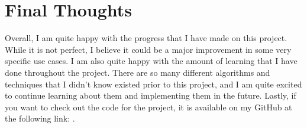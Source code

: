 \documentclass{article}
\begin{document}
\section{Final Thoughts}
Overall, I am quite happy with the progress that I have made on this project. While it is not
perfect, I believe it could be a major improvement in some very specific use cases. I am also
quite happy with the amount of learning that I have done throughout the project. There are so
many different algorithms and techniques that I didn't know existed prior to this project, and
I am quite excited to continue learning about them and implementing them in the future. Lastly,
if you want to check out the code for the project, it is available on my GitHub at the following link:
\url{}.

\newpage
{}


\end{document}

